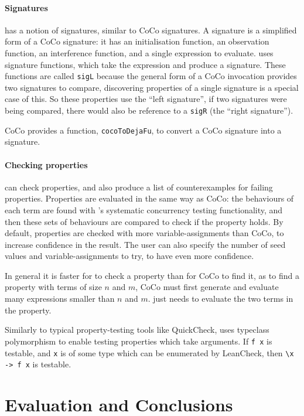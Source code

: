 \paragraph{Signatures}
\dejafu{} has a notion of signatures, similar to CoCo signatures.  A
\dejafu{} signature is a simplified form of a CoCo signature: it has
an initialisation function, an observation function, an interference
function, and a single expression to evaluate.  
uses signature functions, which take the expression and produce a
signature.  These functions are called \texttt{sigL} because the
general form of a CoCo invocation provides two signatures to compare,
discovering properties of a single signature is a special case of
this.  So these properties use the ``left signature'', if two
signatures were being compared, there would also be reference to a
\texttt{sigR} (the ``right signature'').

CoCo provides a function, \texttt{cocoToDejaFu}, to convert a CoCo
signature into a \dejafu{} signature.

\paragraph{Checking properties}
\dejafu{} can check properties, and also produce a list of
counterexamples for failing properties.  Properties are evaluated in
the same way as CoCo: the behaviours of each term are found with
\dejafu{}'s systematic concurrency testing functionality, and then
these sets of behaviours are compared to check if the property holds.
By default, properties are checked with more variable-assignments than
CoCo, to increase confidence in the result.  The user can also specify
the number of seed values and variable-assignments to try, to have
even more confidence.

In general it is faster for \dejafu{} to check a property than for
CoCo to find it, as to find a property with terms of size $n$ and $m$,
CoCo must first generate and evaluate many expressions smaller than
$n$ and $m$.  \dejafu{} just needs to evaluate the two terms in the
property.

Similarly to typical property-testing tools like
QuickCheck\cite{claessen2000}, \dejafu{} uses typeclass polymorphism
to enable testing properties which take arguments.  If \texttt{f x} is
testable, and \texttt{x} is of some type which can be enumerated by
LeanCheck, then \verb|\x -> f x| is testable.

\section{Evaluation and Conclusions}
\label{sec:coco-conclusions}

